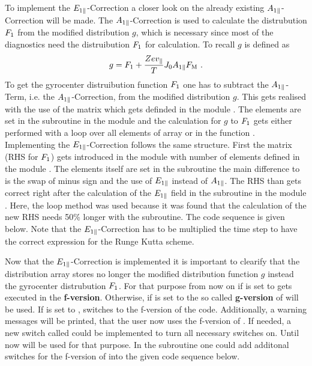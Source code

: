 \newpage
To implement the $E_{1\parallel}$-Correction a closer look on the already existing $A_{1\parallel}$-Correction will be made. The $A_{1\parallel}$-Correction is used to calculate the distrubution $F_1$ from the modified distribution $g$, which is necessary since most of the diagnostics need the distruibution $F_1$ for calculation. To recall $g$ is defined as
\begin{gather}
	g = F_1 + \frac{Ze v_\parallel}{T} J_0 A_{1\parallel} F_\mathrm{M} ~.
	\label{eq:modifiedDistrubutionFunctionRecall}
\end{gather}
To get the gyrocenter distruibution function $F_1$ one has to subtract the $A_{1\parallel}$-Term, i.e. the $A_{1\parallel}$-Correction, from the modified distribution $g$. This gets realised with the use of the matrix  which gets definded in the module . The elements are set in the subroutine  in the module  and the calculation for $g$ to $F_1$ gets either performed with a loop over all elements of array  or in the function . Implementing the $E_{1\parallel}$-Correction follows the same structure. First the matrix  (RHS for $F_1$) gets introduced in the module  with  number of elements defined in the module . The elements itself are set in the subroutine  the main difference to  is the swap of minus sign and the use of $E_{1\parallel}$ instead of $A_{1\parallel}$. The RHS than gets correct right after the calculation of the $E_{1\parallel}$ field in the subroutine  in the module . Here, the loop method was used because it was found that the calculation of the new RHS needs 50\% longer with the  subroutine. The code sequence is given below. Note that the $E_{1\parallel}$-Correction has to be multiplied the time step  to have the correct expression for the Runge Kutta scheme.



Now that the $E_{1\parallel}$-Correction is implemented it is important to clearify that the distribution array  stores no longer the modified distribution function $g$ instead the gyrocenter distrubution $F_1$. For that purpose from now on if  is set to  \gkw gets executed in the \textbf{f-version}. Otherwise, if  is set to  the so called \textbf{g-version} of \gkw will be used. If  is set to , \gkw switches to the f-version of the code. Additionally, a warning messages will be printed, that the user now uses the f-version of \gkw. If needed, a new switch called  could be implemented to turn all necessary switches on. Until now  will be used for that purpose. In the subroutine  one could add additonal switches for the f-version of \gkw into the given code sequence below.


